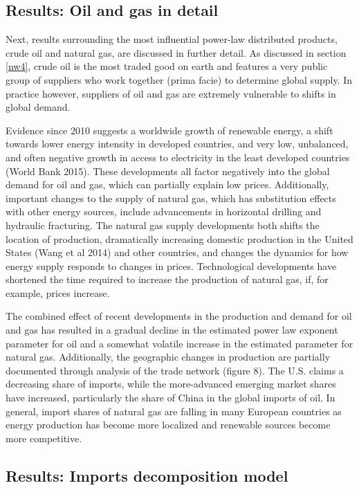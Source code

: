 \documentclass[10pt,letterpaper]{article}
\begin{document}
\subsection{Results: Oil and gas in detail} \label{results_oil_gas_detail}
Next, results surrounding the most influential power-law distributed products, crude oil and natural gas, are discussed in further detail. As discussed in section \ref{nw4}, crude oil is the most traded good on earth and features a very public group of suppliers who work together (prima facie) to determine global supply. In practice however, suppliers of oil and gas are extremely vulnerable to shifts in global demand. 

Evidence since 2010 suggests a worldwide growth of renewable energy, a shift towards lower energy intensity in developed countries, and very low, unbalanced, and often negative growth in access to electricity in the least developed countries (World Bank 2015). These developments all factor negatively into the global demand for oil and gas, which can partially explain low prices. Additionally, important changes to the supply of natural gas, which has substitution effects with other energy sources, include advancements in horizontal drilling and hydraulic fracturing. The natural gas supply developments both shifts the location of production, dramatically increasing domestic production in the United States (Wang et al 2014) and other countries, and changes the dynamics for how energy supply responds to changes in prices. Technological developments have shortened the time required to increase the production of natural gas, if, for example, prices increase.

The combined effect of recent developments in the production and demand for oil and gas has resulted in a gradual decline in the estimated power law exponent parameter for oil and a somewhat volatile increase in the estimated parameter for natural gas. Additionally, the geographic changes in production are partially documented through analysis of the trade network (figure 8). The U.S. claims a decreasing share of imports, while the more-advanced emerging market shares have increased, particularly the share of China in the global imports of oil. In general, import shares of natural gas are falling in many European countries as energy production has become more localized and renewable sources become more competitive.

\subsection{Results: Imports decomposition model} \label{results_mdecomp}
\end{document}
